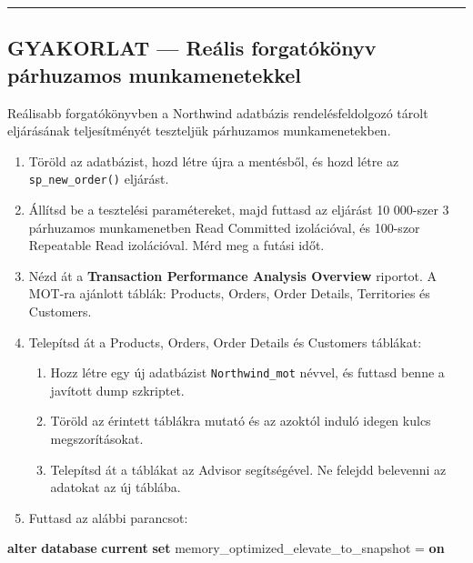 \documentclass[
  magyar,
]{article}
\newenvironment{Shaded}{}{}
\newcommand{\KeywordTok}[1]{\textcolor[rgb]{0.00,0.44,0.13}{\textbf{#1}}}
\newcommand{\NormalTok}[1]{#1}
\newcommand{\OperatorTok}[1]{\textcolor[rgb]{0.40,0.40,0.40}{#1}}
\providecommand{\tightlist}{%
  \setlength{\itemsep}{0pt}\setlength{\parskip}{0pt}}
\begin{document}
\begin{center}\rule{0.5\linewidth}{0.5pt}\end{center}

\subsection{GYAKORLAT --- Reális forgatókönyv párhuzamos
munkamenetekkel}\label{gyakorlat-reuxe1lis-forgatuxf3kuxf6nyv-puxe1rhuzamos-munkamenetekkel}

Reálisabb forgatókönyvben a Northwind adatbázis rendelésfeldolgozó
tárolt eljárásának teljesítményét teszteljük párhuzamos munkamenetekben.

\begin{enumerate}
\def\labelenumi{\arabic{enumi}.}
\tightlist
\item
  Töröld az adatbázist, hozd létre újra a mentésből, és hozd létre az
  \texttt{sp\_new\_order()} eljárást.
\item
  Állítsd be a tesztelési paramétereket, majd futtasd az eljárást 10
  000-szer 3 párhuzamos munkamenetben Read Committed izolációval, és
  100-szor Repeatable Read izolációval. Mérd meg a futási időt.
\item
  Nézd át a \textbf{Transaction Performance Analysis Overview} riportot.
  A MOT-ra ajánlott táblák: Products, Orders, Order Details, Territories
  és Customers.
\item
  Telepítsd át a Products, Orders, Order Details és Customers táblákat:

  \begin{enumerate}
  \def\labelenumii{\alph{enumii}.}
  \tightlist
  \item
    Hozz létre egy új adatbázist \texttt{Northwind\_mot} névvel, és
    futtasd benne a javított dump szkriptet.
  \item
    Töröld az érintett táblákra mutató és az azoktól induló idegen kulcs
    megszorításokat.
  \item
    Telepítsd át a táblákat az Advisor segítségével. Ne felejdd
    belevenni az adatokat az új táblába.
  \end{enumerate}
\item
  Futtasd az alábbi parancsot:
\end{enumerate}

\begin{Shaded}
\begin{Highlighting}[]
\KeywordTok{alter} \KeywordTok{database} \KeywordTok{current} \KeywordTok{set}\NormalTok{ memory\_optimized\_elevate\_to\_snapshot }\OperatorTok{=} \KeywordTok{on}
\end{Highlighting}
\end{Shaded}
\end{document}
